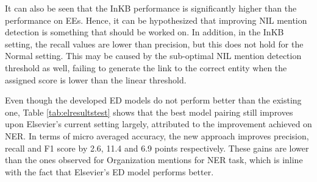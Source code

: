 \documentclass{report}
\theoremstyle{definition}
\theoremstyle{remark}
\begin{document}
It can also be seen that the InKB performance is significantly higher than the performance on EEs. Hence, it can be hypothesized that improving NIL mention detection is something that should be worked on. In addition, in the InKB setting, the recall values are lower than precision, but this does not hold for the Normal setting. This may be caused by the sub-optimal NIL mention detection threshold as well, failing to generate the link to the correct entity when the assigned score is lower than the linear threshold.

Even though the developed ED models do not perform better than the existing one, Table \ref{tab:elresultstest} shows that the best model pairing still improves upon Elsevier's current setting largely, attributed to the improvement achieved on NER. In terms of micro averaged accuracy, the new approach improves precision, recall and F1 score by 2.6, 11.4 and 6.9 points respectively. These gains are lower than the ones observed for Organization mentions for NER task, which is inline with the fact that Elsevier's ED model performs better.
\end{document}

